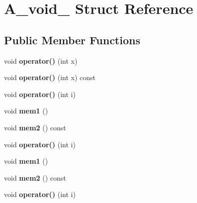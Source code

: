 \hypertarget{struct_a__void__1}{}\section{A\+\_\+void\+\_ Struct Reference}
\label{struct_a__void__1}
\subsection*{Public Member Functions}
\begin{DoxyCompactItemize}
\item 
\mbox{\label{struct_a__void__1_ae2dfa3cb8e0e91dba438d8d4942672da}} 
void {\bfseries operator()} (int x)
\item 
\mbox{\label{struct_a__void__1_a85f9e649bc3fb426f66486a042a96bc1}} 
void {\bfseries operator()} (int x) const
\item 
\mbox{\label{struct_a__void__1_a7783b37629f8c78739554fa11ce30a75}} 
void {\bfseries operator()} (int i)
\item 
\mbox{\label{struct_a__void__1_aa4257ae8b31d75f4e32dff58599560f1}} 
void {\bfseries mem1} ()
\item 
\mbox{\label{struct_a__void__1_a099522f1aaceea875482c597d6d91d13}} 
void {\bfseries mem2} () const
\item 
\mbox{\label{struct_a__void__1_a7783b37629f8c78739554fa11ce30a75}} 
void {\bfseries operator()} (int i)
\item 
\mbox{\label{struct_a__void__1_aa4257ae8b31d75f4e32dff58599560f1}} 
void {\bfseries mem1} ()
\item 
\mbox{\label{struct_a__void__1_a099522f1aaceea875482c597d6d91d13}} 
void {\bfseries mem2} () const
\item 
\mbox{\label{struct_a__void__1_a7783b37629f8c78739554fa11ce30a75}} 
void {\bfseries operator()} (int i)
\item 
\mbox{\label{struct_a__void__1_aa4257ae8b31d75f4e32dff58599560f1}} 

\end{DoxyCompactItemize}
